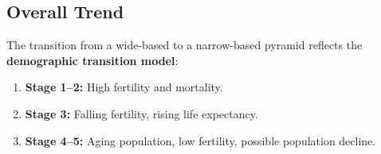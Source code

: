 \subsection*{Overall Trend}
The transition from a wide-based to a narrow-based pyramid reflects the \textbf{demographic transition model}:
\begin{enumerate}
    \item \textbf{Stage 1--2:} High fertility and mortality.  
    \item \textbf{Stage 3:} Falling fertility, rising life expectancy.  
    \item \textbf{Stage 4--5:} Aging population, low fertility, possible population decline.  
\end{enumerate}
